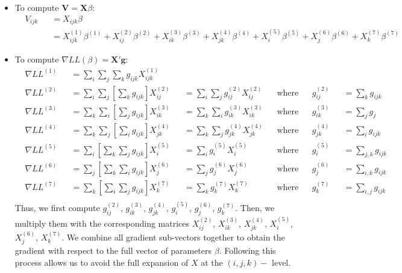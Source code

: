 \documentclass[12pt]{article}
\begin{document}
\begin{itemize}
\item To compute $\textbf{V} = \textbf{X}\beta$:
\begin{equation}
\begin{aligned}
	& V_{ijk} && = X_{ijk} \beta \\
	& && = X^{(1)}_{ijk} \beta^{(1)} + X^{(2)}_{ij} \beta^{(2)} + X^{(3)}_{ik} \beta^{(3)} + X^{(4)}_{jk} \beta^{(4)} + X^{(5)}_{i} \beta^{(5)} + X^{(6)}_{j} \beta^{(6)} + X^{(7)}_{k} \beta^{(7)} 
\end{aligned}
\end{equation}

\item To compute $\nabla LL(\beta) = \textbf{X}' \textbf{g}$:
	\begin{equation}
	\begin{aligned}
		& \nabla LL^{(1)} && = \sum_{i} \sum_{j} \sum_{k} g_{ijk} X^{(1)}_{ijk}		  \\
		& \nabla LL^{(2)} && = \sum_{i} \sum_{j} \left[\sum_{k} g_{ijk} \right] X^{(2)}_{ij}		&& = \sum_{i} \sum_{j} g^{(2)}_{ij} X^{(2)}_{ij}	&& \text{where} && g^{(2)}_{ij} && = \sum_{k} g_{ijk}  \\
		& \nabla LL^{(3)} && = \sum_{k} \sum_{i} \left[ \sum_{j} g_{ijk} \right] X^{(3)}_{ik}	&& = \sum_{k} \sum_{i} g^{(3)}_{ik} X^{(3)}_{ik}	&& \text{where} && g^{(3)}_{ik} && = \sum_{j} g_{j}  \\		
		& \nabla LL^{(4)} && = \sum_{k} \sum_{j} \left[ \sum_{i}  g_{ijk} \right] X^{(4)}_{jk}	&& = \sum_{k} \sum_{j} g^{(4)}_{jk} X^{(4)}_{jk}	&& \text{where} && g^{(4)}_{jk} && = \sum_{i} g_{ijk}  \\
		& \nabla LL^{(5)} && = \sum_{i} \left[ \sum_{k} \sum_{j} g_{ijk} \right] X^{(5)}_{i}		&& = \sum_{i}  g^{(5)}_{i} X^{(5)}_{i}				&& \text{where} && g^{(5)}_{i} && = \sum_{j,k} g_{ijk}  \\
		& \nabla LL^{(6)} && = \sum_{j} \left[ \sum_{k} \sum_{i} g_{ijk} \right] X^{(6)}_{j}		&& = \sum_{j} g^{(6)}_{j} X^{(6)}_{j}			&& \text{where} && g^{(6)}_{j} && = \sum_{i,k} g_{ijk}  \\		& \nabla LL^{(7)} && = \sum_{k} \left[ \sum_{i} \sum_{j} g_{ijk} \right] X^{(7)}_{k}		&& = \sum_{k}  g^{(7)}_{k} X^{(7)}_{k}				&& \text{where} && g^{(7)}_{k} && = \sum_{i,j} g_{ijk}  \\
	\end{aligned}
	\end{equation}
	Thus, we first compute $g^{(2)}_{ij}$, $g^{(3)}_{ik}$, $g^{(4)}_{jk}$, $g^{(5)}_{i}$, $g^{(6)}_{j}$, $g^{(7)}_{k}$. Then, we multiply them with the corresponding matrices $X^{(2)}_{ij}$, $X^{(3)}_{ik}$, $X^{(4)}_{jk}$, $X^{(5)}_{i}$, $X^{(6)}_{j}$, $X^{(7)}_{k}$. We combine all gradient sub-vectors together to obtain the gradient with respect to the full vector of parameters $\beta$. Following this process allows us to avoid the full expansion of $X$ at the $(i,j,k)-$ level.


\end{itemize}
\end{document}
